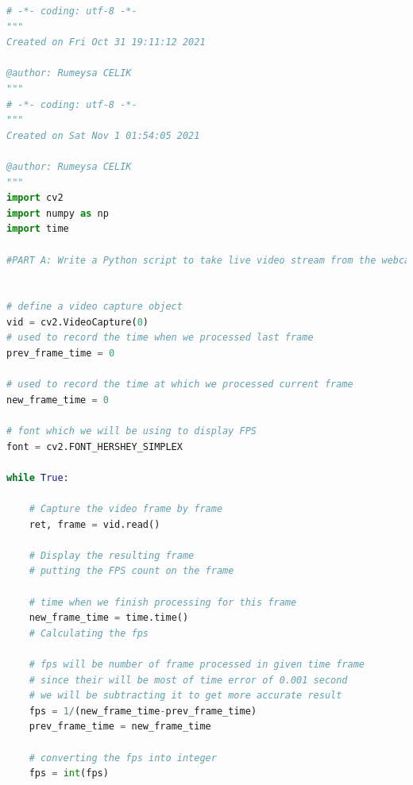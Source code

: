 \documentclass[a4paper, 12pt]{report}
\begin{document}

\lstset{style=mystyle}
\begin{lstlisting}[language=Python]
# -*- coding: utf-8 -*-
"""
Created on Fri Oct 31 19:11:12 2021

@author: Rumeysa CELIK
"""
# -*- coding: utf-8 -*-
"""
Created on Sat Nov 1 01:54:05 2021

@author: Rumeysa CELIK
"""
import cv2
import numpy as np
import time 

#PART A: Write a Python script to take live video stream from the webcam of your computer, compute the gradient magnitude on the grayscale version of the image, and display the input and the gradient magnitude on the screen. 


# define a video capture object
vid = cv2.VideoCapture(0)
# used to record the time when we processed last frame
prev_frame_time = 0

# used to record the time at which we processed current frame
new_frame_time = 0

# font which we will be using to display FPS
font = cv2.FONT_HERSHEY_SIMPLEX

while True:
      
    # Capture the video frame by frame
    ret, frame = vid.read()
    
    # Display the resulting frame
    # putting the FPS count on the frame
 
    # time when we finish processing for this frame
    new_frame_time = time.time()
    # Calculating the fps
    
    # fps will be number of frame processed in given time frame
    # since their will be most of time error of 0.001 second
    # we will be subtracting it to get more accurate result
    fps = 1/(new_frame_time-prev_frame_time)
    prev_frame_time = new_frame_time
       
    # converting the fps into integer
    fps = int(fps)
       

\end{lstlisting}
\end{document}
